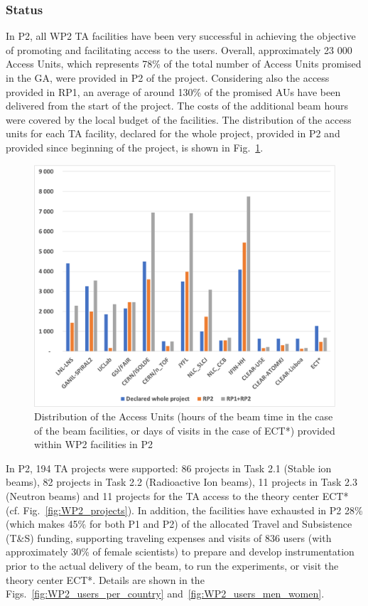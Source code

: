 \subsubsection*{Status}


In P2, all WP2 TA facilities have been very successful in achieving the objective of promoting and facilitating access to the users. Overall, approximately 23 000 Access Units, which represents  78\% of the total number of Access Units promised in the GA, were provided in P2 of the project. 
Considering also the access provided in RP1, 
an average of around 130\% of the promised AUs have been delivered from the start of the project. The costs of the additional beam hours were covered by the local budget of the facilities. The distribution of the access units for each TA facility, declared for the whole project, provided in P2 and provided since beginning of the project, is shown in Fig.~\ref{fig:WP2_AU_statistics}.

\begin{figure}[!h]
    \centering
    \includegraphics[width=0.8\linewidth]{graphics/WP2_AU_statistics.png}
    \caption{Distribution of the Access Units (hours of the beam time in the case of the beam facilities, or days of visits in the case of ECT*) provided within WP2 facilities in P2}
    \label{fig:WP2_AU_statistics}
\end{figure}

In P2, 194 TA projects were supported: 86 projects in Task 2.1 (Stable ion beams), 82 projects in Task 2.2 (Radioactive Ion beams), 11 projects in Task 2.3 (Neutron beams) and 11 projects for the TA access to the theory center ECT* (cf. Fig.~\ref{fig:WP2_projects}).  In addition, the facilities have exhausted in P2 28\% (which makes 45\% for both P1 and P2) of the allocated Travel and Subsistence (T\&S) funding, supporting traveling expenses and visits of 836 users (with approximately 30\% of female scientists) to prepare and develop instrumentation prior to the actual delivery of the beam, to run the experiments, or visit the theory center ECT*. Details are shown in the Figs.~\ref{fig:WP2_users_per_country} and~\ref{fig:WP2_users_men_women}. 


